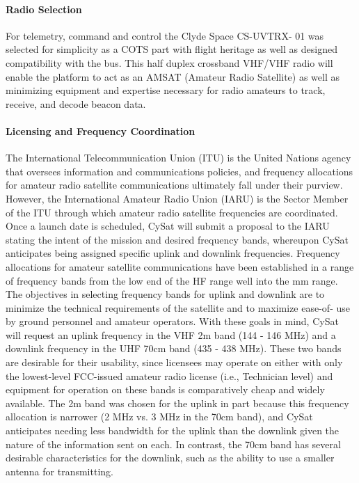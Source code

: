 \documentclass[nocover]            %
{CSLI}                       %
\begin{document}
\paragraph{Radio Selection\\}
For telemetry, command and control the Clyde Space CS-UVTRX- 01 was selected for simplicity as a COTS part with flight heritage as well as designed compatibility with the bus. This half duplex crossband VHF/VHF radio will enable the platform to act as an AMSAT (Amateur Radio Satellite) as well as minimizing equipment and expertise necessary for radio amateurs to track, receive, and decode beacon data.
\paragraph{Licensing and Frequency Coordination\\}
The International Telecommunication Union (ITU) is the United Nations agency that oversees information and communications policies, and frequency allocations for amateur radio satellite communications ultimately fall under their purview. However, the International Amateur Radio Union (IARU) is the Sector Member of the ITU through which amateur radio satellite frequencies are coordinated. Once a launch date is scheduled, CySat will submit a proposal to the IARU stating the intent of the mission and desired frequency bands, whereupon CySat anticipates being assigned specific uplink and downlink frequencies. Frequency allocations for amateur satellite communications have been established in a range of frequency bands from the low end of the HF range well into the mm range. The objectives in selecting frequency bands for uplink and downlink are to minimize the technical requirements of the satellite and to maximize ease-of- use by ground personnel and amateur operators. With these goals in mind, CySat will request an uplink frequency in the VHF 2m band (144 - 146 MHz) and a downlink frequency in the UHF 70cm band (435 - 438 MHz). These two bands are desirable for their usability, since licensees may operate on either with only the lowest-level FCC-issued amateur radio license (i.e., Technician level) and equipment for operation on these bands is comparatively cheap and widely available. The 2m band was chosen for the uplink in part because this frequency allocation is narrower (2 MHz vs. 3 MHz in the 70cm band), and CySat anticipates needing less bandwidth for the uplink than the downlink given the nature of the information sent on each. In contrast, the 70cm band has several desirable characteristics for the downlink, such as the ability to use a smaller antenna for transmitting.
\end{document}
